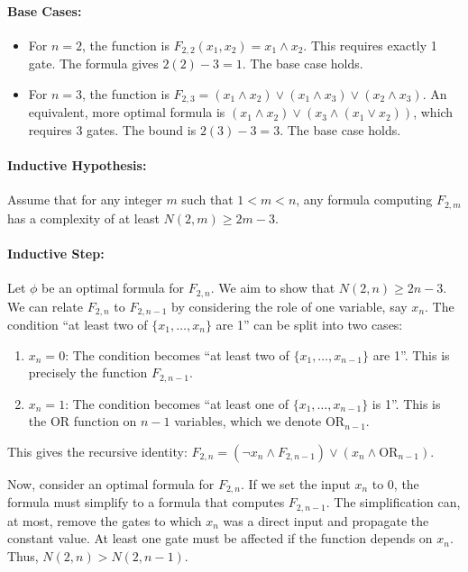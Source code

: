 \documentclass{solutionclass} %
\begin{document}
\paragraph{Base Cases:}
\begin{itemize}
    \item For $n=2$, the function is $F_{2,2}(x_1, x_2) = x_1 \land x_2$. This requires exactly 1 gate. The formula gives $2(2) - 3 = 1$. The base case holds.
    \item For $n=3$, the function is $F_{2,3} = (x_1 \land x_2) \lor (x_1 \land x_3) \lor (x_2 \land x_3)$. An equivalent, more optimal formula is $(x_1 \land x_2) \lor (x_3 \land (x_1 \lor x_2))$, which requires 3 gates. The bound is $2(3) - 3 = 3$. The base case holds.
\end{itemize}

\paragraph{Inductive Hypothesis:} Assume that for any integer $m$ such that $1 < m < n$, any formula computing $F_{2,m}$ has a complexity of at least $N(2, m) \geq 2m - 3$.

\paragraph{Inductive Step:} Let $\phi$ be an optimal formula for $F_{2,n}$. We aim to show that $N(2,n) \geq 2n - 3$. We can relate $F_{2,n}$ to $F_{2,n-1}$ by considering the role of one variable, say $x_n$. The condition ``at least two of $\{x_1, \dots, x_n\}$ are 1'' can be split into two cases:
\begin{enumerate}
    \item $x_n = 0$: The condition becomes ``at least two of $\{x_1, \dots, x_{n-1}\}$ are 1''. This is precisely the function $F_{2,n-1}$.
    \item $x_n = 1$: The condition becomes ``at least one of $\{x_1, \dots, x_{n-1}\}$ is 1''. This is the OR function on $n-1$ variables, which we denote $\text{OR}_{n-1}$.
\end{enumerate}
This gives the recursive identity: $F_{2,n} = (\neg x_n \land F_{2,n-1}) \lor (x_n \land \text{OR}_{n-1})$.

Now, consider an optimal formula for $F_{2,n}$. If we set the input $x_n$ to 0, the formula must simplify to a formula that computes $F_{2,n-1}$. The simplification can, at most, remove the gates to which $x_n$ was a direct input and propagate the constant value. At least one gate must be affected if the function depends on $x_n$. Thus, $N(2,n) > N(2,n-1)$.
\end{document}
